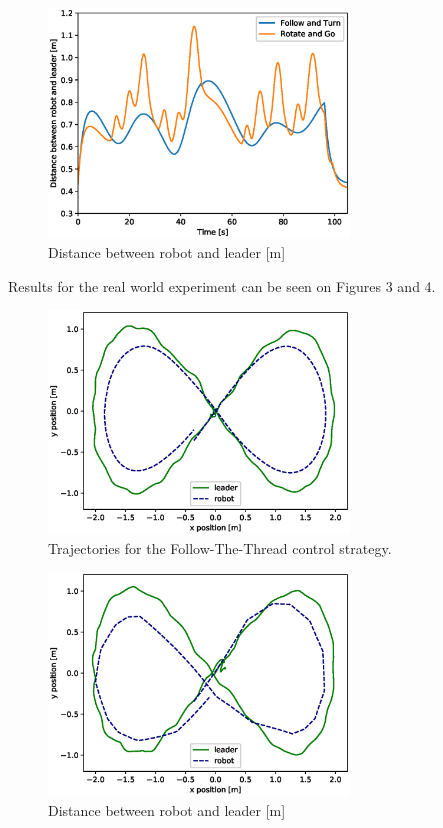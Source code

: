 \documentclass[journal]{IEEEtran}
\begin{document}
\begin{figure}[h!]
\centering
\includegraphics[width=8cm]{images/ft_vs_rg_dist.eps}
\caption{Distance between robot and leader [m]}
\label{fig:distance_sim}
\end{figure}


Results for the real world experiment can be seen on Figures 3 and 4.

\begin{figure}[h!]
\centering
\includegraphics[width=8cm]{images/ft1cap.eps}
\caption{Trajectories for the Follow-The-Thread control strategy.}
\label{fig:distance_sim}
\end{figure}


\begin{figure}[h!]
\centering
\includegraphics[width=8cm]{images/rg2cap.eps}
\caption{Distance between robot and leader [m]}
\label{fig:distance_sim}
\end{figure}
\end{document}
